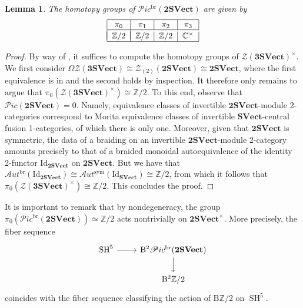 \documentclass[11pt,reqno]{amsart}
\DeclareMathOperator{\br}{br}
\newcommand{\Z}{\mathbb{Z}}
\DeclareMathOperator{\SH}{SH}
\newcommand{\tSVect}{\mathbf{2SVect}}
\newcommand{\sPic}{\mathscr{P}ic}
\newcommand{\cZ}{\mathcal{Z}}
\newcommand{\sAut}{\mathscr{A}ut}
\newcommand{\rB}{\mathrm{B}}
\numberwithin{equation}{section}
\theoremstyle{plain}
\newtheorem{lem}[equation]{Lemma}
\theoremstyle{definition}
\begin{document}
\begin{lem}\label{lem:piPicbr}
The homotopy groups of $\sPic^{\br}(\tSVect)$ are given by
\begin{equation}\label{eq:picbr2svect}
\begin{tabular}{|c|c|c|c|c|}
\hline
$\pi_0$ & $\pi_1$ & $\pi_2$ & $\pi_3$\\
\hline \\[-1em]
$\Z/2$ & $\Z/2$ &  $\Z/2$ &  $\mathbb{C}^{\times}$\\
\hline
\end{tabular}
\end{equation}
\end{lem}
\begin{proof}
By way of , it suffices to compute the homotopy groups of $\cZ(\mathbf{3SVect})^\times$.  We first consider $\Omega \cZ(\mathbf{3SVect})\cong \cZ_{(2)}(\tSVect)\cong \tSVect$, where the first equivalence is in \cite[Section IV.B]{JF} and the second holds by inspection.
It therefore only remains to argue that $\pi_0(\cZ(\mathbf{3SVect})^\times)\cong \Z/2$.
To this end, observe that $\sPic(\tSVect) = 0$.
Namely, equivalence classes of invertible $\mathbf{2SVect}$-module 2-categories correspond to Morita equivalence classes of invertible $\mathbf{SVect}$-central fusion 1-categories, of which there is only one.
Moreover, given that $\mathbf{2SVect}$ is symmetric, the data of a braiding on an invertible $\mathbf{2SVect}$-module 2-category amounts precisely to that of a braided monoidal autoequivalence of the identity 2-functor $\mathrm{Id}_{\mathbf{2SVect}}$ on $\mathbf{2SVect}$.
But we have that $\sAut^{\br}(\mathrm{Id}_{\mathbf{2SVect}})\cong\sAut^{\mathrm{sym}}(\mathrm{Id}_{\mathbf{SVect}})\cong\mathbb{Z}/2$, from which it follows that $\pi_0(\cZ(\mathbf{3SVect})^\times)\cong \Z/2$. This concludes the proof.


\end{proof}

It is important to remark that by nondegeneracy, the group $\pi_0(\sPic^{\br}(\tSVect))\simeq \Z/2$ acts nontrivially on $\tSVect^\times$. More precisely, the fiber sequence 
 \begin{equation}\label{eq:actionSH5}
     \begin{tikzcd}
         \SH^5 \arrow[r]& \mathrm{B}^2\sPic^{\br}(\tSVect) \arrow[d]\\
         & \rB^2 \Z/2
     \end{tikzcd}
 \end{equation}
coincides with the fiber sequence classifying the action of $\mathrm{B}\mathbb{Z}/2$ on $\SH^5$.
\end{document}
